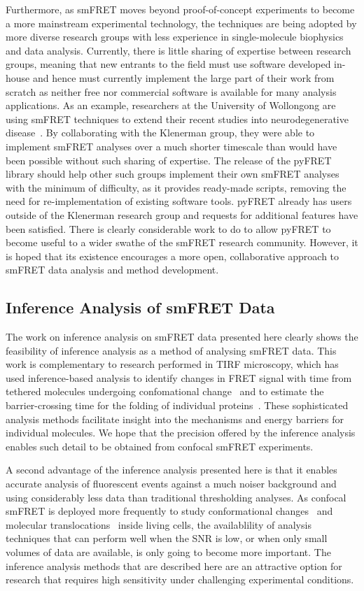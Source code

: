 Furthermore, as smFRET moves beyond proof-of-concept experiments to become a more mainstream experimental technology, the techniques are being adopted by more diverse research groups with less experience in single-molecule biophysics and data analysis. Currently, there is little sharing of expertise between research groups, meaning that new entrants to the field must use software developed in-house and hence must currently implement the large part of their work from scratch as neither free nor commercial software is available for many analysis applications. As an example, researchers at the University of Wollongong are using smFRET techniques to extend their recent studies into neurodegenerative disease~\cite{Hochberg2013}. By collaborating with the Klenerman group, they were able to implement smFRET analyses over a much shorter timescale than would have been possible without such sharing of expertise. The release of the pyFRET library should help other such groups implement their own smFRET analyses with the minimum of difficulty, as it provides ready-made scripts, removing the need for re-implementation of existing software tools. pyFRET already has users outside of the Klenerman research group and requests for additional features have been satisfied. There is clearly considerable work to do to allow pyFRET to become useful to a wider swathe of the smFRET research community. However, it is hoped that its existence encourages a more open, collaborative approach to smFRET data analysis and method development. 

\subsection{Inference Analysis of smFRET Data}
The work on inference analysis on smFRET data presented here clearly shows the feasibility of inference analysis as a method of analysing smFRET data. This work is complementary to research performed in TIRF microscopy, which has used inference-based analysis to identify changes in FRET signal with time from tethered molecules undergoing confomational change~\cite{mckinney06} and to estimate the barrier-crossing time for the folding of individual proteins~\cite{chung2013}. These sophisticated analysis methods facilitate insight into the mechanisms and energy barriers for individual molecules. We hope that the precision offered by the inference analysis enables such detail to be obtained from confocal smFRET experiments.

A second advantage of the inference analysis presented here is that it enables accurate analysis of fluorescent events against a much noiser background and using considerably less data than traditional thresholding analyses. As confocal smFRET is deployed more frequently to study conformational changes~\cite{Sustarsic2015} and molecular translocations~\cite{Kusumi2013} inside living cells, the availablility of analysis techniques that can perform well when the SNR is low, or when only small volumes of data are available, is only going to become more important. The inference analysis methods that are described here are an attractive option for research that requires high sensitivity under challenging experimental conditions.

